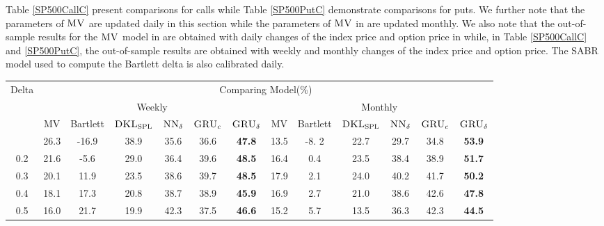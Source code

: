 \documentclass[letterpaper,12pt,titlepage,oneside,final]{book}
\numberwithin{equation}{section}
\theoremstyle{definition}
\newcommand{\model}{\textsc{GRU}_\delta}
\newcommand{\modelN}{\textsc{NN}_\delta}
\newcommand{\DKLs}{\bf\textsc{DKL}_{\text{SPL}}}
\newcommand{\MV}{\bf \textsc{MV}}
\begin{document}
Table \ref{SP500CallC} present comparisons for calls while Table \ref{SP500PutC} demonstrate comparisons for puts.
We further note that  the parameters of $\MV$ are updated daily  in this section while the parameters of $\MV$ in \cite{hulloptimal} are updated monthly.
We also note that the out-of-sample results for the $\MV$ model in \cite{hulloptimal}  are obtained with daily changes of the index price and option price in  \cite{hulloptimal}  while, in Table \ref{SP500CallC} and \ref{SP500PutC}, the out-of-sample results are obtained with weekly and monthly changes of the index price and option price. The SABR model used to compute the Bartlett delta is also calibrated  daily.



\begin{table}[htp!]
	\centering
	\small
	\begin{threeparttable}
		\begin{tabular}{|c|cccccc| cccccc|}
			\hline
			\multirow{4}{*}{Delta}&\multicolumn{12}{c|}{Comparing Model(\%)}\\
			&\multicolumn{6}{c}{Weekly }&\multicolumn{6}{c|}{Monthly}\\ %
			&{\tiny MV}& {\tiny Bartlett}&\multicolumn{1}{c}{\tiny $\DKLs$}
			&\multicolumn{1}{c}{\tiny $\modelN$ } &\multicolumn{1}{c}{\tiny $\textsc{GRU}_{c}$} &\multicolumn{1}{c}{\tiny $\model$}
            &{\tiny MV}& {\tiny Bartlett} &\multicolumn{1}{c}{\tiny $\DKLs$}
            &\multicolumn{1}{c}{\tiny $\modelN$} &\multicolumn{1}{c}{\tiny $\textsc{GRU}_{c}$} & \multicolumn{1}{c|}{\tiny $\model$ } \\ \hline
			0.1 &26.3 &-16.9   &38.9    &35.6  & 36.6 &\textbf{47.8}   &13.5  & -8. 2   &22.7 &29.7         &34.8     & \textbf{53.9}  \\
			
			0.2 &21.6 &-5.6   &29.0     &36.4    &39.6  &\textbf{48.5}    &16.4  & 0.4   &23.5 &38.4      &38.9   & \textbf{51.7}  \\
			
			0.3 &20.1 &11.9   &23.5     &38.6   &39.7  &\textbf{48.5}    &17.9  & 2.1   &24.0 &40.2         &41.7 & \textbf{50.2}  \\
			
			0.4 &18.1 &17.3   &20.8     &38.7 &38.9  &\textbf{45.9}    &16.9  & 2.7   &21.0 &38.6           & 42.6& \textbf{47.8}  \\
			
			0.5 &16.0 &21.7   &19.9     &42.3   &37.5   &\textbf{46.6}    &15.2  & 5.7   &13.5 &36.3    &42.3       & \textbf{44.5}  \\
			

\end{tabular}
\end{threeparttable}
\end{table}
\end{document}
